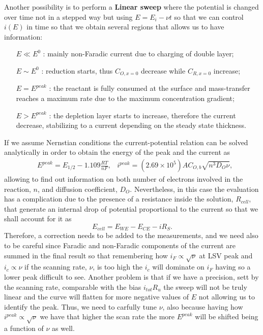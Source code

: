 Another possibility is to perform a \textbf{Linear sweep} where the potential is changed over time not in a stepped way but using $E = E_i - \nu t$ so that we can control $i(E)$ in time so that we obtain several regions that allows us to have information:
\begin{itemize}[align=left, leftmargin=*]
    \item[$E\ll E^0$]: mainly non-Faradic current due to charging of double layer;
    \item[$E\sim E^0$]: reduction starts, thus $C_{O, x=0}$ decrease while $C_{R, x=0}$ increase;
    \item[$E=E^{peak}$]: the reactant is fully consumed at the surface and mass-transfer reaches a maximum rate due to the maximum concentration gradient;
    \item[$E > E^{peak}$]: the depletion layer starts to increase, therefore the current decrease, stabilizing to a current depending on the steady state thickness.
\end{itemize}
If we assume Nernstian conditions the current-potential relation can be solved analytically in order to obtain the energy of the peak and the current as
\begin{align}
    &E^{peak} = E_{1/2} - 1.109\frac{RT}{nF}, &i^{peak} = (2.69\times 10^5)AC_{O,b}\sqrt{n^3 D_O\nu},
\end{align}
allowing to find out information on both number of electrons involved in the reaction, $n$, and diffusion coefficient, $D_O$. Nevertheless, in this case the evaluation has a complication due to the presence of a resistance inside the solution, $R_{cell}$, that generate an internal drop of potential proportional to the current so that we shall account for it as
\begin{equation}
    E_{cell} = E_{WE} - E_{CE} - iR_S.
\end{equation}
Therefore, a correction needs to be added to the measurements, and we need also to be careful since Faradic and non-Faradic components of the current are summed in the final result so that remembering how $i_F \propto \sqrt{\nu}$ at LSV peak and $i_c \propto \nu$ if the scanning rate, $\nu$, is too high the $i_c$ will dominate on $i_F$ having so a lower peak difficult to see. Another problem is that if we have a precision, sett by the scanning rate, comparable with the bias $i_{tot}R_u$ the sweep will not be truly linear and the curve will flatten for more negative values of $E$ not allowing us to identify the peak. Thus, we need to carfully tune $\nu$, also because having how $i^{peak} \propto \sqrt{\nu}$ we have that higher the scan rate the more $E^{peak}$ will be shifted being a function of $\nu$ as well.


